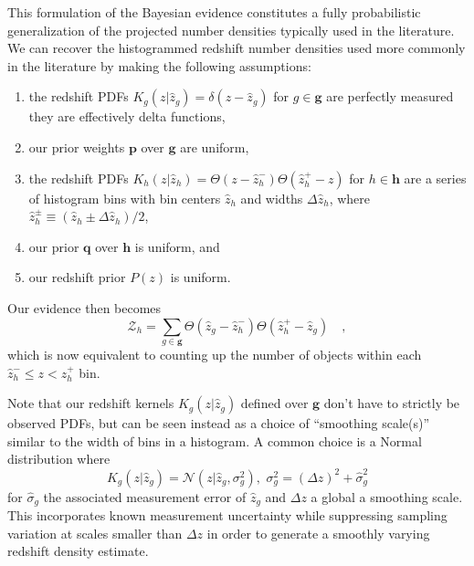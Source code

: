 \documentclass[a4paper,fleqn,usenatbib,english]{mnras}
\begin{document}
This formulation of the Bayesian evidence constitutes a fully probabilistic generalization of the projected number densities typically used in the literature. We can recover the histogrammed redshift number densities used more commonly in the literature by making the following assumptions:
\begin{enumerate}
    \item the redshift PDFs $K_g(z|\hat{z}_g) = \delta(z-\hat{z}_g)$ for $g \in \mathbf{g}$ are perfectly measured they are effectively delta functions,
    \item our prior weights $\mathbf{p}$ over $\mathbf{g}$ are uniform,
    \item the redshift PDFs $K_h(z|\hat{z}_h) = \Theta\left(z - \hat{z}_h^{-}\right) \Theta\left(\hat{z}_h^{+} - z\right)$ for $h \in \mathbf{h}$ are a series of histogram bins with bin centers $\hat{z}_h$ and widths $\Delta \hat{z}_h$, where $\hat{z}_h^{\pm} \equiv \left(\hat{z}_h \pm \Delta\hat{z}_h\right)/2$,
    \item our prior $\mathbf{q}$ over $\mathbf{h}$ is uniform, and
    \item our redshift prior $P(z)$ is uniform.
\end{enumerate}
Our evidence then becomes
\begin{equation}
\mathcal{Z}_h = \sum_{g \in \mathbf{g}} \Theta\left(\hat{z}_g - \hat{z}_h^{-}\right) \Theta\left(\hat{z}_h^{+} - \hat{z}_g\right) \quad ,
\end{equation}
which is now equivalent to counting up the number of objects within each $\hat{z}_h^{-} \leq z < \hat{z}_h^{+}$ bin.

Note that our redshift kernels $K_g(z|\hat{z}_g)$ defined over $\mathbf{g}$ don't have to strictly be observed PDFs, but can be seen instead as a choice of ``smoothing scale(s)'' similar to the width of bins in a histogram. A common choice is a Normal distribution where
\begin{equation}
K_g(z|\hat{z}_g)=\mathcal{N}(z|\hat{z}_g,\sigma_g^2),\,\,\sigma_g^2=(\Delta z)^2+\hat{\sigma}_g^2
\end{equation}
for $\hat{\sigma}_g$ the associated measurement error of $\hat{z}_g$ and $\Delta z$ a global a smoothing scale. This incorporates known measurement uncertainty while suppressing sampling variation at scales smaller than $\Delta z$ in order to generate a smoothly varying redshift density estimate.
\end{document}
